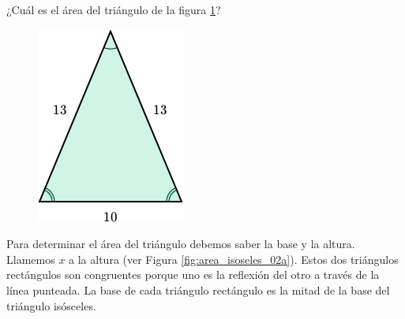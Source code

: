 ¿Cuál es el \'area del triángulo de la figura \ref{fig:area_isoseles_02}?

\begin{figure}[H]
    \centering
    \includegraphics[width=0.2\linewidth]{../images/area_isoseles_02.png}
    \caption{}
    \label{fig:area_isoseles_02}
\end{figure}
\begin{solutionbox}{15cm}
    \begin{minipage}{0.6\textwidth}
        Para determinar el área del triángulo debemos saber la base y la altura. Llamemos $x$ a la altura (ver Figura \ref{fig:area_isoseles_02a}).
        Estos dos triángulos rectángulos son congruentes porque uno es la reflexión del otro a través de la línea punteada.
        La base de cada triángulo rectángulo es la mitad de la base del triángulo isósceles.


\end{minipage}
\end{solutionbox}

